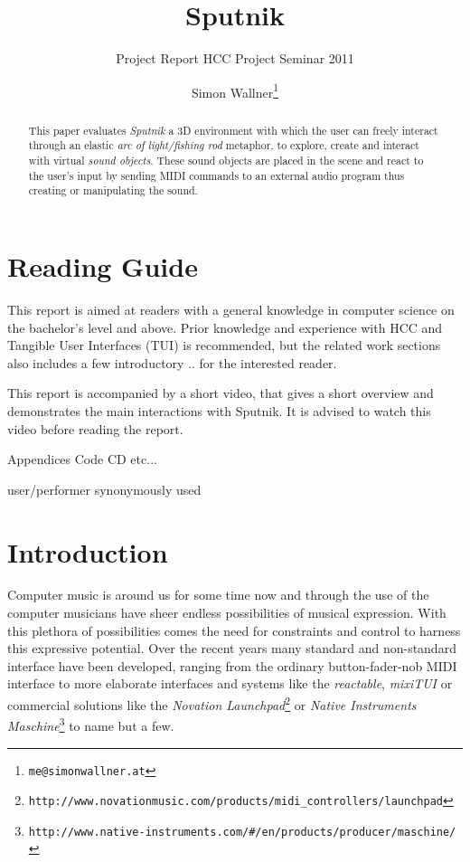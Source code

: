 \documentclass[10pt,a4paper]{scrartcl}
\title{Sputnik}
\subtitle{Project Report HCC Project Seminar 2011}
\author{Simon Wallner\footnote{\texttt{me@simonwallner.at}}}
\begin{document}
\maketitle

\begin{abstract}
This paper evaluates \emph{Sputnik} a 3D environment with which the user can freely interact through an elastic \emph{arc of light/fishing rod} metaphor, to explore, create and interact with virtual \emph{sound objects}. These sound objects are placed in the scene and react to the user's input by sending MIDI commands to an external audio program thus creating or manipulating the sound.

\end{abstract}

\section{Reading Guide}
This report is aimed at readers with a general knowledge in computer science on the bachelor's level and above. Prior knowledge and experience with HCC and Tangible User Interfaces (TUI) is recommended, but the related work sections also includes a few introductory .. for the interested reader.

This report is accompanied by a short video, that gives a short overview and demonstrates the main interactions with Sputnik. It is advised to watch this video before reading the report. 


Appendices
Code
CD
etc...

user/performer synonymously used


\section{Introduction}

Computer music is around us for some time now and through the use of the computer musicians have sheer endless possibilities of musical expression. With this plethora of possibilities comes the need for constraints and control to harness this expressive potential. Over the recent years many standard and non-standard interface have been developed, ranging from the ordinary button-fader-nob MIDI interface to more elaborate interfaces and systems like the \emph{reactable}\cite{Jorda2007}, \emph{mixiTUI}\cite{Pedersen2009} or commercial solutions like the \emph{Novation Launchpad}\footnote{\texttt{http://www.novationmusic.com/products/midi\_controllers/launchpad}} or \emph{Native Instruments Maschine}\footnote{\texttt{http://www.native-instruments.com/\#/en/products/producer/maschine/}} to name but a few.
\end{document}
